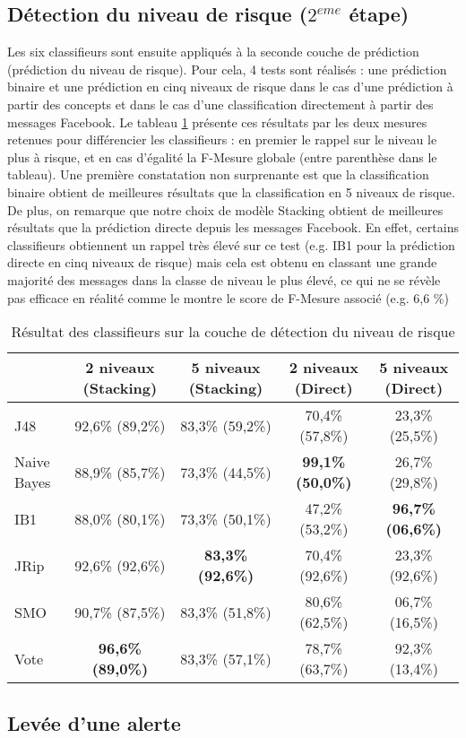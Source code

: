 \subsection{Détection du niveau de risque ($2^{eme}$ étape)}

Les six classifieurs sont ensuite appliqués à la seconde couche de prédiction (prédiction du niveau de risque). Pour cela, 4 tests sont réalisés : une prédiction binaire et une prédiction en cinq niveaux de risque dans le cas d'une prédiction à partir des concepts et dans le cas d'une classification directement à partir des messages Facebook. Le tableau \ref{tab_precision_niveau} présente ces résultats par les deux mesures retenues pour différencier les classifieurs : en premier le rappel sur le niveau le plus à risque, et en cas d'égalité la F-Mesure globale (entre parenthèse dans le tableau). Une première constatation non surprenante est que la classification binaire obtient de meilleures résultats que la classification en 5 niveaux de risque. De plus, on remarque que notre choix de modèle Stacking obtient de meilleures résultats que la prédiction directe depuis les messages Facebook. En effet, certains classifieurs obtiennent un rappel très élevé sur ce test (e.g. IB1 pour la prédiction directe en cinq niveaux de risque) mais cela est obtenu en classant une grande majorité des messages dans la classe de niveau le plus élevé, ce qui ne se révèle pas efficace en réalité comme le montre le score de F-Mesure associé (e.g. 6,6 \%)

\begin{table}[htb]
\center\small
\begin{tabular*}{\linewidth}{@{\extracolsep{\fill}}lcccc}
\hline\hline
& 2 niveaux (Stacking) & 5 niveaux (Stacking) & 2 niveaux (Direct) & 5 niveaux (Direct) \\
\hline
J48
& 92,6\% \footnotesize{(89,2\%)} & 83,3\% \footnotesize{(59,2\%)} 
& 70,4\% \footnotesize{(57,8\%)} & 23,3\% \footnotesize{(25,5\%)}\\
Naive Bayes
& 88,9\% \footnotesize{(85,7\%)} & 73,3\% \footnotesize{(44,5\%)} 
& \textbf{99,1\% \footnotesize{(50,0\%)}} & 26,7\% \footnotesize{(29,8\%)}\\
IB1
& 88,0\% \footnotesize{(80,1\%)} & 73,3\% \footnotesize{(50,1\%)} 
& 47,2\% \footnotesize{(53,2\%)} & \textbf{96,7\% \footnotesize{(06,6\%)}}\\
JRip
& 92,6\% \footnotesize{(92,6\%)} & \textbf{83,3\% \footnotesize{(92,6\%)}} 
& 70,4\% \footnotesize{(92,6\%)} & 23,3\% \footnotesize{(92,6\%)}\\
SMO 
& 90,7\% \footnotesize{(87,5\%)} & 83,3\% \footnotesize{(51,8\%)} 
& 80,6\% \footnotesize{(62,5\%)} & 06,7\% \footnotesize{(16,5\%)}\\
Vote 
& \textbf{96,6\% \footnotesize{(89,0\%)}} & 83,3\% \footnotesize{(57,1\%)} 
& 78,7\% \footnotesize{(63,7\%)} & 92,3\% \footnotesize{(13,4\%)}\\
\hline
\end{tabular*}
\caption{Résultat des classifieurs sur la couche de détection du niveau de risque}
\label{tab_precision_niveau}
\end{table}

\subsection{Levée d'une alerte}